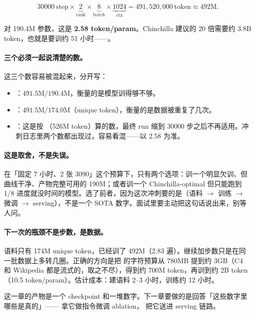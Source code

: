 \[
30000\ \mbox{step} \times \underbrace{2}_{\mbox{rank}} \times \underbrace{8}_{\mbox{batch}} \times \underbrace{1024}_{\mbox{ctx}}
= 491{,}520{,}000\ \mbox{token} \approx 492\mbox{M} .
\]

对 190.4M 参数，这是 \textbf{2.58 token/param}。Chinchilla 建议的 20 倍需要约 3.8B token，也就是要训约 51 小时——。

\paragraph{三个必须一起说清楚的数。}这三个数容易被混起来，分开写：

\begin{itemize}\itemsep2pt
  \item {}：$491.5\mbox{M} / 190.4\mbox{M}$，衡量的是模型训得够不够。
  \item {}：$491.5\mbox{M} / 174.0\mbox{M}$（unique token），衡量的是数据被重复了几次。
  \item {}：这是按 （526M token）算的数，最终 run 缩到 30000 步之后不再适用。冲刺日志里两个数都出现过，容易看混——以 2.58 为准。
\end{itemize}

\paragraph{这是取舍，不是失误。}在「固定 7 小时、2 张 3090」这个预算下，只有两个选项：训一个明显欠训、但曲线干净、产物完整可用的 190M；或者训一个 Chinchilla-optimal 但只能跑到 1/8 进度就没时间的模型。选了前者，因为这次冲刺要的是（语料 $\to$ 训练 $\to$ 微调 $\to$ serving），不是一个 SOTA 数字。面试里要主动把这句话说出来，别等人问。

\paragraph{下一次的瓶颈不是步数，是数据。}语料只有 174M unique token，已经训了 492M（2.83 遍）。继续加步数只是在同一批数据上多转几圈。正确的方向是把  的字符预算从 780MB 提到约 3GB（C4 和 Wikipedia 都是流式的，取之不尽），得到约 700M token，再训到约 2B token（10.5 token/param）。估计成本：建语料 2--3 小时，训练约 12 小时。

\medskip
\noindent 这一章的产物是一个 checkpoint 和一堆数字。下一章要做的是回答「这些数字里哪些是真的」—— 拿它做指令微调 ablation， 把它送进 serving 链路。
